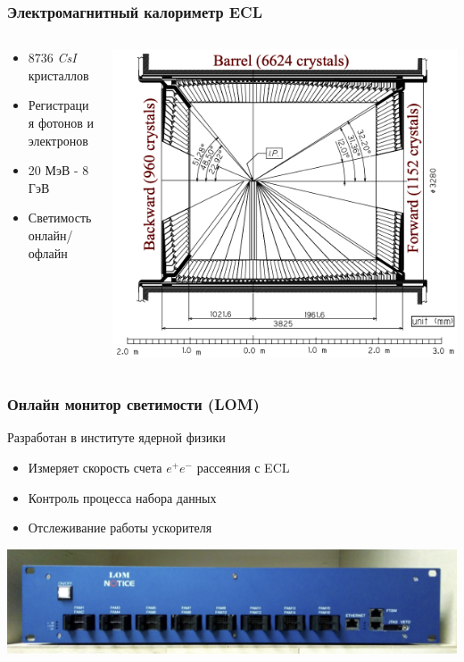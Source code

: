 \documentclass{beamer}
\begin{document}
\begin{frame}
\frametitle{Электромагнитный калориметр ECL}
    \begin{columns}
        \begin{column}{0.5\textwidth}
            \begin{itemize}
                \item 8736 \textit{CsI} кристаллов
                \item Регистрация фотонов и электронов
                \item 20 МэВ - 8 ГэВ
                \item Светимость онлайн/офлайн
            \end{itemize}
        \end{column}
        \begin{column}{0.5\textwidth}
            \includegraphics[width=\textwidth]{ECL}
        \end{column}
    \end{columns}
\end{frame}

\begin{frame}
\frametitle{Онлайн монитор светимости (LOM)}
Разработан в институте ядерной физики
    \begin{itemize}
        \item Измеряет скорость счета $e^+e^-$ рассеяния с ECL
        \item Контроль процесса набора данных
        \item Отслеживание работы ускорителя
    \end{itemize}
    \includegraphics[width=\textwidth]{LOM_picture}
\end{frame}
\end{document}
